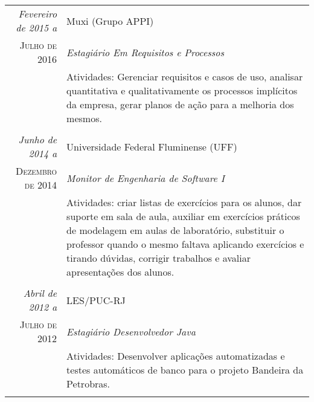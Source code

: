 \documentclass[a4paper,10pt]{article}
\begin{document}
\begin{tabular}{r|p{11cm}}
 \emph{Fevereiro de 2015 a} & Muxi (Grupo APPI) \\
 \textsc{Julho de 2016}&\emph{Estagiário Em Requisitos e Processos}\\
 &\footnotesize{Atividades: Gerenciar requisitos e casos de uso, analisar quantitativa e qualitativamente os processos implícitos da empresa, gerar planos de ação para a melhoria dos mesmos.}\\
 
 & \\
 
 \emph{Junho de 2014 a} & Universidade Federal Fluminense (UFF) \\
 \textsc{Dezembro de 2014}&\emph{Monitor de Engenharia de Software I}\\
 &\footnotesize{Atividades: criar listas de exercícios para os alunos, dar suporte em sala de aula, auxiliar em exercícios práticos de modelagem em aulas de laboratório, substituir o professor quando o mesmo faltava aplicando exercícios e tirando dúvidas, corrigir trabalhos e avaliar apresentações dos alunos.}\\
 
  & \\
 
 \emph{Abril de 2012 a} & LES/PUC-RJ \\
 \textsc{Julho de 2012}&\emph{Estagiário Desenvolvedor Java}\\
 &\footnotesize{Atividades: Desenvolver aplicações automatizadas e testes automáticos de banco para o projeto Bandeira da Petrobras.}\\
 
 \multicolumn{2}{c}{} \end{tabular}
 
\end{document}
